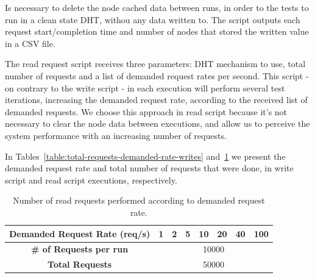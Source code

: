 Is necessary to delete the node cached data between runs, in order to the tests to run in a clean state DHT, withou any data written to.
The script outputs each request start/completion time and number of nodes that stored the written value in a CSV file.

The read request script receives three parameters: DHT mechanism to use, total number of requests and a list of demanded request rates per second.
This script - on contrary to the write script - in each execution will perform several test iterations, increasing the demanded request rate, according to the received list of demanded requests.
We choose this approach in read script because it's not necessary to clear the node data between executions, and allow us to perceive the system performance with an increasing number of requests.

In Tables~\ref{table:total-requests-demanded-rate-writes} and~\ref{table:total-requests-demanded-rate-reads} we present the demanded request rate and total number of requests that were done, in write script and read script executions, respectively.

\begin{table}[]
\centering
{}
\caption{Number of write requests performed according to demanded request rate.}
\label{table:total-requests-demanded-rate-writes}
\end{table}

\begin{table}[]
\centering
\begin{tabular}{cccccccc}
  \textbf{Demanded Request Rate (req/s)} & 1 & 2 & 5 & 10 & 20 & 40 & 100 \\ \hline
  \textbf{\# of Requests per run} & \multicolumn{7}{c}{10000} \\ \hline
  \textbf{Total Requests} & \multicolumn{7}{c}{50000} \\ \hline
\end{tabular}
\caption{Number of read requests performed according to demanded request rate.}
\label{table:total-requests-demanded-rate-reads}
\end{table}

